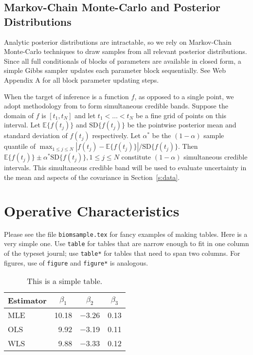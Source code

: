 \documentclass[useAMS,referee,usenatbib]{biom}
\begin{document}
\subsection{Markov-Chain Monte-Carlo and Posterior Distributions}
\label{s:posteriors}
Analytic posterior distributions are intractable, so we rely on Markov-Chain Monte-Carlo techniques to draw samples from all relevant posterior distributions. Since all full conditionals of blocks of parameters are available in closed form, a simple Gibbs sampler updates each parameter block sequentially. See Web Appendix A for all block parameter updating steps.

When the target of inference is a function $f$, as opposed to a single point, we adopt methodology from \citet{Crainiceanu2007} to form simultaneous credible bands. Suppose the domain of $f$ is $[t_{1}, t_{N}]$ and let $t_{1} < \ldots < t_{N}$ be a fine grid of points on this interval. Let $\mathbb{E}\{f(t_{j})\}$ and $\text{SD}\{f(t_{j})\}$ be the pointwise posterior mean and standard deviation of $f(t_{j})$ respectively. Let $\alpha^{*}$ be the $(1-\alpha)$ sample quantile of $\max_{1\leq j \leq N} |f(t_{j}) - \mathbb{E}\{f(t_{j})\}|/\text{SD}\{f(t_{j})\}$. Then $\mathbb{E}\{f(t_{j})\} \pm \alpha^{*} \text{SD}\{f(t_{j})\}, 1\leq j\leq N$ constitute $(1-\alpha)$ simultaneous credible intervals. This simultaneous credible band will be used to evaluate uncertainty in the mean and aspects of the covariance in Section~\ref{s:data}.

\section{Operative Characteristics}
\label{s:simulation}

Please see the file \texttt{biomsample.tex} for fancy examples of making
tables.  Here is a very simple one.  Use \texttt{table} for tables
that are narrow enough to fit in one column of the typeset journl; use
\texttt{table*} for tables that need to span two columns.  For
figures, use of \texttt{figure} and \texttt{figure*} is analogous. 

\begin{table}
	\caption{This is a simple table.}
	\label{t:one}
	\begin{center}
		\begin{tabular}{lrrr}
			\Hline
			Estimator & \multicolumn{1}{c}{$\beta_1$} &  \multicolumn{1}{c}{$\beta_2$} & 
			\multicolumn{1}{c}{$\beta_3$} \\ \hline
			MLE & 10.18 & $-$3.26 & 0.13 \\
			OLS & 9.92 & $-$3.19 & 0.11 \\
			WLS & 9.88 & $-$3.33 & 0.12 \\
			\hline
		\end{tabular}
	\end{center}
\end{table}
\end{document}
